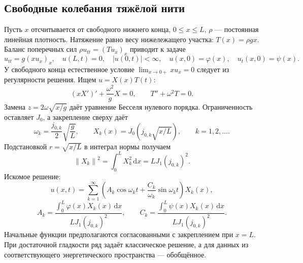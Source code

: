 \documentclass[12pt,a4paper]{article}
\newcommand{\dd}{\,\mathrm{d}}
\newcommand{\norm}[1]{\left\lVert#1\right\rVert}
\begin{document}
\subsection{Свободные колебания тяжёлой нити}
Пусть $x$ отсчитывается от свободного нижнего конца, $0\le x\le L$, $\rho$ --- постоянная линейная плотность. Натяжение равно весу нижележащего участка: $T(x)=\rho gx$. Баланс поперечных сил $\rho u_{tt}=(Tu_x)_x$ приводит к задаче
\begin{equation}\label{eq:string1}
u_{tt}=g(xu_x)_x,\quad u(L,t)=0,\quad |u(0,t)|<\infty,
\quad u(x,0)=\varphi(x),\quad u_t(x,0)=\psi(x).
\end{equation}
У свободного конца естественное условие $\lim_{x\to0+}xu_x=0$ следует из регулярности решения. Ищем $u=X(x)T(t)$:
\[
(xX')'+\frac{\omega^2}{g}X=0,\qquad T''+\omega^2T=0.
\]
Замена $z=2\omega\sqrt{x/g}$ даёт уравнение Бесселя нулевого порядка. Ограниченность оставляет $J_0$, а закрепление сверху даёт
\[
\omega_k=\frac{j_{0,k}}2\sqrt{\frac gL},\qquad
X_k(x)=J_0(j_{0,k}\sqrt{x/L}),\qquad k=1,2,\ldots.
\]
Подстановкой $r=\sqrt{x/L}$ в интеграл нормы получаем
\[
\norm{X_k}^2=\int_0^L X_k^2\dd x=LJ_1(j_{0,k})^2.
\]
Искомое решение:
\begin{equation}\label{eq:sol1}
u(x,t)=\sum_{k=1}^{\infty}
\left(A_k\cos\omega_kt+\frac{C_k}{\omega_k}\sin\omega_kt\right)X_k(x),
\end{equation}
\[
A_k=\frac{\int_0^L\varphi(x)X_k(x)\dd x}{LJ_1(j_{0,k})^2},\qquad
C_k=\frac{\int_0^L\psi(x)X_k(x)\dd x}{LJ_1(j_{0,k})^2}.
\]
Начальные функции предполагаются согласованными с закреплением при $x=L$. При достаточной гладкости ряд задаёт классическое решение, а для данных из соответствующего энергетического пространства --- обобщённое.
\end{document}
